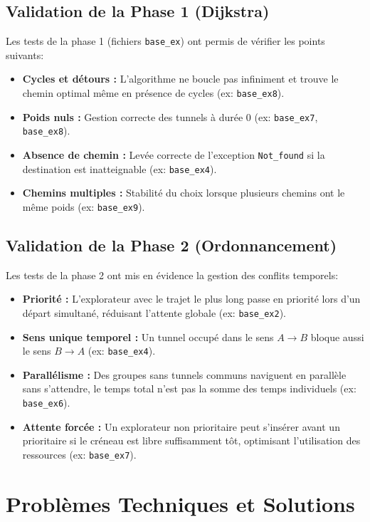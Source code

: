 \documentclass[a4paper,11pt]{article}
\begin{document}
\subsection{Validation de la Phase 1 (Dijkstra)}
Les tests de la phase 1 (fichiers \texttt{base\_ex}) ont permis de vérifier les points suivants:
\begin{itemize}
    \item \textbf{Cycles et détours :} L'algorithme ne boucle pas infiniment et trouve le chemin optimal même en présence de cycles (ex: \texttt{base\_ex8}).
    \item \textbf{Poids nuls :} Gestion correcte des tunnels à durée 0 (ex: \texttt{base\_ex7}, \texttt{base\_ex8}).
    \item \textbf{Absence de chemin :} Levée correcte de l'exception \texttt{Not\_found} si la destination est inatteignable (ex: \texttt{base\_ex4}).
    \item \textbf{Chemins multiples :} Stabilité du choix lorsque plusieurs chemins ont le même poids (ex: \texttt{base\_ex9}).
\end{itemize}

\subsection{Validation de la Phase 2 (Ordonnancement)}
Les tests de la phase 2 ont mis en évidence la gestion des conflits temporels:
\begin{itemize}
    \item \textbf{Priorité :} L'explorateur avec le trajet le plus long passe en priorité lors d'un départ simultané, réduisant l'attente globale (ex: \texttt{base\_ex2}).
    \item \textbf{Sens unique temporel :} Un tunnel occupé dans le sens $A \to B$ bloque aussi le sens $B \to A$ (ex: \texttt{base\_ex4}).
    \item \textbf{Parallélisme :} Des groupes sans tunnels communs naviguent en parallèle sans s'attendre, le temps total n'est pas la somme des temps individuels (ex: \texttt{base\_ex6}).
    \item \textbf{Attente forcée :} Un explorateur non prioritaire peut s'insérer avant un prioritaire si le créneau est libre suffisamment tôt, optimisant l'utilisation des ressources (ex: \texttt{base\_ex7}).
\end{itemize}

\section{Problèmes Techniques et Solutions}
\end{document}

